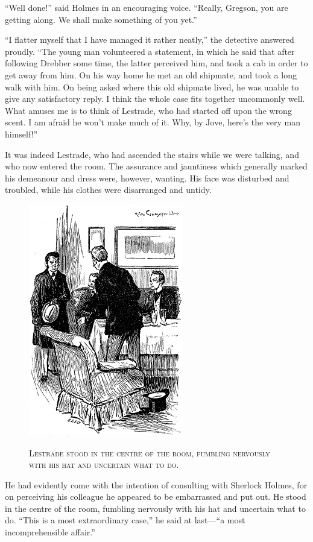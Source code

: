 \documentclass[12pt,english,oneside]{book}
\newcommand{\noun}[1]{\textsc{#1}}
\newcommand{\mdsh}[1]{\mbox{#1}\linebreak[1]}
\begin{document}
{}``Well done!'' said Holmes in an encouraging voice. {}``Really,
Gregson, you are getting along. We shall make something of you yet.''

{}``I flatter myself that I have managed it rather neatly,'' the
detective answered proudly. {}``The young man volunteered a statement,
in which he said that after following Drebber some time, the latter
perceived him, and took a cab in order to get away from him. On his
way home he met an old shipmate, and took a long walk with him. On
being asked where this old shipmate lived, he was unable to give any
satisfactory reply. I think the whole case fits together uncommonly
well. What amuses me is to think of Lestrade, who had started off
upon the wrong scent. I am afraid he won't make much of it. Why, by
Jove, here's the very man himself!''

It was indeed Lestrade, who had ascended the stairs while we were
talking, and who now entered the room. The assurance and jauntiness
which generally marked his demeanour and dress were, however, wanting.
His face was disturbed and troubled, while his clothes were disarranged
and untidy. %
\begin{figure}[htbp]
\noindent \begin{center}\includegraphics{images/study10-stud-11.png}\end{center}

\noindent \begin{center}\noun{Lestrade stood in the centre of the
room, fumbling nervously with his hat and uncertain what to do.}\end{center}
\end{figure}
He had evidently come with the intention of consulting with Sherlock
Holmes, for on perceiving his colleague he appeared to be embarrassed
and put out. He stood in the centre of the room, fumbling nervously
with his hat and uncertain what to do. {}``This is a most extraordinary
case,'' he said at last\mdsh{---}{}``a most incomprehensible affair.''
\end{document}
